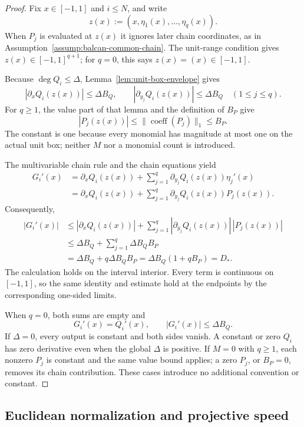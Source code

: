 \begin{proof}
Fix $x\in[-1,1]$ and $i\leq N$, and write
\[
z(x):=(x,\eta_1(x),\ldots,\eta_q(x)).
\]
When $P_j$ is evaluated at $z(x)$ it ignores later chain coordinates, as in
Assumption~\ref{assump:balcan-common-chain}.  The unit-range condition gives
$z(x)\in[-1,1]^{q+1}$; for $q=0$, this says $z(x)=(x)\in[-1,1]$.

Because $\deg Q_i\leq\Delta$, Lemma~\ref{lem:unit-box-envelope} gives
\[
|\partial_xQ_i(z(x))|\leq\Delta B_Q,
\qquad
|\partial_{y_j}Q_i(z(x))|\leq\Delta B_Q
\quad(1\leq j\leq q).
\]
For $q\geq1$, the value part of that lemma and the definition of $B_P$ give
\[
|P_j(z(x))|
\leq\|\operatorname{coeff}(P_j)\|_1
\leq B_P.
\]
The constant is one because every monomial has magnitude at most one on the
actual unit box; neither $M$ nor a monomial count is introduced.

The multivariable chain rule \citep{rudin1976principles} and the chain
equations yield
\[
\begin{aligned}
G_i'(x)
&=\partial_xQ_i(z(x))
 +\sum_{j=1}^q\partial_{y_j}Q_i(z(x))\eta_j'(x)\\
&=\partial_xQ_i(z(x))
 +\sum_{j=1}^q\partial_{y_j}Q_i(z(x))P_j(z(x)).
\end{aligned}
\]
Consequently,
\[
\begin{aligned}
|G_i'(x)|
&\leq |\partial_xQ_i(z(x))|
 +\sum_{j=1}^q
 |\partial_{y_j}Q_i(z(x))|\,|P_j(z(x))|\\
&\leq\Delta B_Q+\sum_{j=1}^q\Delta B_QB_P\\
&=\Delta B_Q+q\Delta B_QB_P
=\Delta B_Q(1+qB_P)=D_*.
\end{aligned}
\]
The calculation holds on the interval interior.  Every term is continuous on
$[-1,1]$, so the same identity and estimate hold at the endpoints by the
corresponding one-sided limits.

When $q=0$, both sums are empty and
\[
G_i'(x)=Q_i'(x),
\qquad
|G_i'(x)|\leq\Delta B_Q.
\]
If $\Delta=0$, every output is constant and both sides vanish.  A constant or
zero $Q_i$ has zero derivative even when the global $\Delta$ is positive.  If
$M=0$ with $q\geq1$, each nonzero $P_j$ is constant and the same value bound
applies; a zero $P_j$, or $B_P=0$, removes its chain contribution.  These
cases introduce no additional convention or constant.
\end{proof}

\subsection{Euclidean normalization and projective speed}
\label{app:projective-speed}

